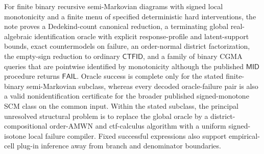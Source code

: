 For finite binary recursive semi-Markovian diagrams with signed local monotonicity and a finite menu of specified deterministic hard interventions, the note proves a Dedekind-count canonical reduction, a terminating global real-algebraic identification oracle with explicit response-profile and latent-support bounds, exact countermodels on failure, an order-normal district factorization, the empty-sign reduction to ordinary \(\mathsf{CTFID}\), and a family of binary CGMA queries that are pointwise identified by monotonicity although the published \(\mathsf{MID}\) procedure returns \(\mathsf{FAIL}\).  Oracle success is complete only for the stated finite-binary semi-Markovian subclass, whereas every decoded oracle-failure pair is also a valid nonidentification certificate for the broader published signed-monotone SCM class on the common input.  Within the stated subclass, the principal unresolved structural problem is to replace the global oracle by a district-compositional order-AMWN and ctf-calculus algorithm with a uniform signed-isotone local failure compiler.  Fixed successful expressions also support empirical-cell plug-in inference away from branch and denominator boundaries.